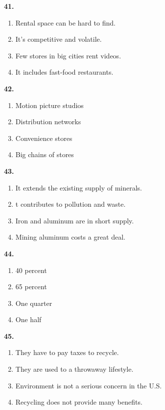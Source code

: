 \documentclass[12pt]{article}
\begin{document}
\par
\vspace{0.25\baselineskip}
\noindent\textbf{41.}
\begin{enumerate}[label=(\Alph*),leftmargin=*,itemsep=0.2em]
\item Rental space can be hard to find.
\item It's competitive and volatile.
\item Few stores in big cities rent videos.
\item It includes fast-food restaurants.
\end{enumerate}
\par
\vspace{0.25\baselineskip}
\noindent\textbf{42.}
\begin{enumerate}[label=(\Alph*),leftmargin=*,itemsep=0.2em]
\item Motion picture studios
\item Distribution networks
\item Convenience stores
\item Big chains of stores
\end{enumerate}
\par
\vspace{0.25\baselineskip}
\noindent\textbf{43.}
\begin{enumerate}[label=(\Alph*),leftmargin=*,itemsep=0.2em]
\item It extends the existing supply of minerals.
\item t contributes to pollution and waste.
\item Iron and aluminum are in short supply.
\item Mining aluminum costs a great deal.
\end{enumerate}
\par
\vspace{0.25\baselineskip}
\noindent\textbf{44.}
\begin{enumerate}[label=(\Alph*),leftmargin=*,itemsep=0.2em]
\item 40 percent
\item 65 percent
\item One quarter
\item One half
\end{enumerate}
\par
\vspace{0.25\baselineskip}
\noindent\textbf{45.}
\begin{enumerate}[label=(\Alph*),leftmargin=*,itemsep=0.2em]
\item They have to pay taxes to recycle.
\item They are used to a throwaway lifestyle.
\item Environment is not a serious concern in the U.S.
\item Recycling does not provide many benefits.
\end{enumerate}
\end{document}
